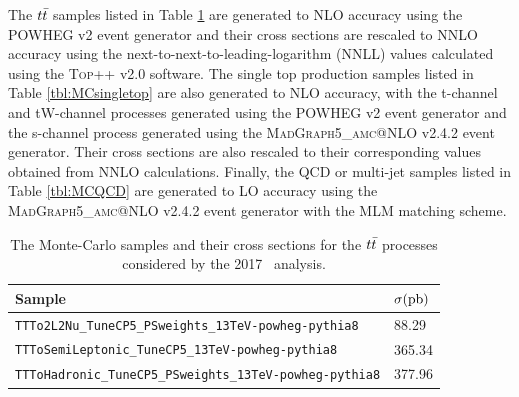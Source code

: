 The $\qrkt\bar{\qrkt}$\cite{MCTT} samples listed in Table \ref{tbl:MCttbar} are generated to NLO accuracy using the \textsc{\small POWHEG} v2 event generator and their cross sections are rescaled to NNLO accuracy using the next-to-next-to-leading-logarithm (NNLL) values calculated using the \textsc{\small Top++} v2.0\cite{TOPPP} software. The single top production samples listed in Table \ref{tbl:MCsingletop} are also generated to NLO accuracy, with the t-channel\cite{MCsingletopT} and tW-channel\cite{MCsingletopTW} processes generated using the \textsc{\small POWHEG} v2 event generator and the s-channel\cite{MCsingletopS} process generated using the \textsc{\small MadGraph5\_amc@NLO} v2.4.2 event generator. Their cross sections are also rescaled to their corresponding values obtained from NNLO calculations.\cite{singletopNNLOA,singletopNNLOB} Finally, the QCD or multi-jet samples listed in Table \ref{tbl:MCQCD} are generated to LO accuracy using the \textsc{\small MadGraph5\_amc@NLO} v2.4.2 event generator with the MLM matching scheme.

\begin{table}[htbp]
  \caption[$\qrkt\bar{\qrkt}$ Samples for \VHbb\ 2017]{The Monte-Carlo samples and their cross sections for the $\qrkt\bar{\qrkt}$ processes considered by the 2017 \VHbb\ analysis.}
  \label{tbl:MCttbar}
  \begin{tabularx}{6.5in}{lX}
    \hline
    Sample                                                          & $\sigma (\mathrm{pb})$ \\
    \hline
    \texttt{TTTo2L2Nu\_TuneCP5\_PSweights\_13TeV-powheg-pythia8}    & 88.29          \\
    \texttt{TTToSemiLeptonic\_TuneCP5\_13TeV-powheg-pythia8}        & 365.34         \\
    \texttt{TTToHadronic\_TuneCP5\_PSweights\_13TeV-powheg-pythia8} & 377.96         \\
    \hline
  \end{tabularx}
\end{table}

